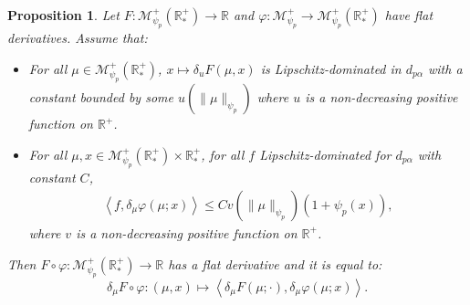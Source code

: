 \documentclass[11pt,a4paper]{article}
\newcommand{\RR}{\mathbb{R}}
\newcommand{\RRP}{\mathbb{R}^+_*}
\newcommand{\MC}{\mathcal{M}}
\newcommand{\brac}[1]{\left\langle#1\right\rangle}
\newtheorem{proposition}[theorem]{Proposition}
\begin{document}
\begin{proposition}\label{prop:chain-rule}
    Let $F : \MC_{\psi_p}^+(\RRP) \to \RR$ and $\varphi : \MC^+_{\psi_p} \to \MC_{\psi_p}^+(\RRP)$ have flat derivatives. Assume that:
    \begin{itemize}
        \item For all $\mu \in \MC^+_{\psi_p}(\RRP)$, $x \mapsto \delta_u F(\mu,x)$ is Lipschitz-dominated in $d_{p\alpha}$ with a constant bounded by some $u(\|\mu\|_{\psi_p})$ where $u$ is a non-decreasing positive function on $\RR^+$.
        \item For all $\mu,x \in \MC^+_{\psi_p}(\RRP)\times \RRP$, for all $f$ Lipschitz-dominated for $d_{p\alpha}$ with constant $C$, 
        \begin{align*}
            \brac{f, \delta_\mu \varphi(\mu;x)} \leq Cv(\|\mu\|_{\psi_p})(1 + \psi_p(x)), 
        \end{align*}
        where $v$ is a non-decreasing positive function on $\RR^+$.
    \end{itemize}
    Then \(F\circ \varphi : \MC_{\psi_p}^+(\RRP) \to \RR\) has a flat derivative and it is equal to:
    \[
    \delta_\mu F\circ \varphi : \left(\mu,x \right) \mapsto \brac{\delta_\mu  F(\mu;\cdot),\delta_\mu\varphi(\mu;x)}.
    \]
\end{proposition}
\end{document}
